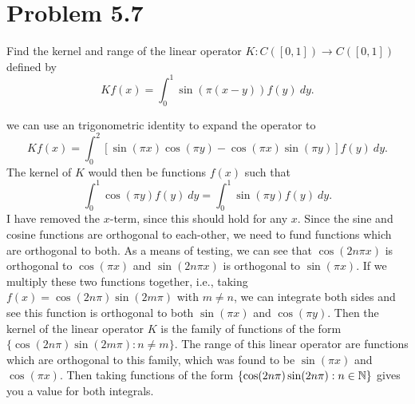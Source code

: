 \newpage
\section{Problem 5.7}
Find the kernel and range of the linear operator $K: C([0, 1]) \rightarrow C([0, 1])$ defined by 
\[ Kf(x) = \int_0^1 \sin\left( \pi (x - y)\right)f(y) \ dy.\]
\partbreak
\begin{solution}
    we can use an trigonometric identity to expand the operator to
    \[Kf(x) = \int_0^2 \left[\sin(\pi x) \cos(\pi y) - \cos(\pi x) \sin(\pi y) \right]f(y) \ dy.\]
    The kernel of $K$ would then be functions $f(x)$ such that 
    \[\int_0^1 \cos(\pi y)f(y) \ dy = \int_0^1 \sin (\pi y) f(y) \ dy.\]
    I have removed the $x$-term, since this should hold for any $x$. Since the sine and cosine functions are orthogonal to each-other, we need to fund functions which are orthogonal to both. As a means of testing, we can see that $\cos(2n\pi x)$ is orthogonal to $\cos(\pi x)$ and $\sin(2n\pi x)$ is orthogonal to $\sin(\pi x)$. If we multiply these two functions together, i.e., taking $f(x) = \cos(2n\pi) \sin(2m \pi)$ with $m \neq n$, we can integrate both sides and see this function is orthogonal to both $\sin(\pi x)$ and $\cos(\pi y)$. Then the kernel of the linear operator $K$ is the family of functions of the form  $\{ \cos(2n\pi) \sin(2m \pi) : n \neq m \}$. The range of this linear operator are functions which are orthogonal to this family, which was found to be $\sin(\pi x)$ and $\cos(\pi x)$. Then taking functions of the form $\{ \cos(2n\pi) \sin(2n\pi) : n \in \mathbb{N}\}$ gives you a value for both integrals. 
\end{solution}

\newpage
